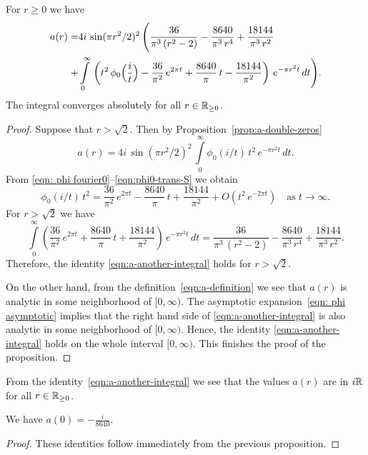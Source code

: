 \begin{proposition}\label{prop:a-another-integral}
For $r\geq0$ we have
\begin{align}\label{eqn:a-another-integral}a(r)=&4i\,\sin(\pi r^2/2)^2\,\Bigg(\frac{36}{\pi^3\,(r^2-2)}-\frac{8640}{\pi^3\,r^4}+\frac{18144}{\pi^3\,r^2}\\ +&\int\limits_0^\infty\,\left(t^2\,\phi_0\Big(\frac{i}{t}\Big)-\frac{36}{\pi^2}\,e^{2\pi t}+\frac{8640}{\pi}\,t-\frac{18144}{\pi^2}\right)\,e^{-\pi r^2 t}\,dt \Bigg) .\notag\end{align}
The integral converges absolutely for all $r\in\mathbb{R}_{\geq 0}$.
\end{proposition}
\begin{proof}
Suppose that $r>\sqrt{2}$. Then by Proposition~\ref{prop:a-double-zeros}
$$a(r)=4i\,\sin(\pi r^2/2)^2\,\int\limits_{0}^{\infty}\phi_0(i/t)\,t^2\,e^{-\pi r^2 t}\,dt. $$
From \eqref{eqn: phi fourier0}--\eqref{eqn:phi0-trans-S} we obtain
\begin{equation}\label{eqn: phi asymptotic}
\phi_0(i/t)\,t^2=\frac{36}{\pi^2}\,e^{2 \pi t}-\frac{8640}{\pi}\,t+\frac{18144}{\pi^2}+O(t^2\,e^{-2\pi t})\quad\mbox{as}\;t\to\infty.
\end{equation}
For $r>\sqrt{2}$ we have
\begin{equation}
\int\limits_0^\infty \left(\frac{36}{\pi^2}\,e^{2 \pi t}+\frac{8640}{\pi}\,t+\frac{18144}{\pi^2}\right)\,e^{-\pi r^2 t}\,dt
=\frac{36}{\pi^3\,(r^2-2)}-\frac{8640}{\pi^3\,r^4}+\frac{18144}{\pi^3\,r^2}.\end{equation}
Therefore, the identity \eqref{eqn:a-another-integral} holds for $r>\sqrt{2}$.

On the other hand, from the definition~\eqref{eqn:a-definition} we see that $a(r)$ is analytic in some neighborhood of $[0,\infty)$. The asymptotic expansion~\eqref{eqn: phi asymptotic} implies that the right hand side of \eqref{eqn:a-another-integral} is also analytic in some neighborhood of $[0,\infty)$. Hence, the identity \eqref{eqn:a-another-integral} holds on the whole interval $[0,\infty)$. This finishes the proof of the proposition.
\end{proof}
From the identity~\eqref{eqn:a-another-integral} we see that the values $a(r)$ are in $i\mathbb{R}$ for all $r\in\mathbb{R}_{\geq0}$.
\begin{proposition}\label{prop:a0}
We have $a(0) = -\frac{i}{8640}$.
\end{proposition}
\begin{proof}
These identities follow immediately from the previous proposition.
\end{proof}

